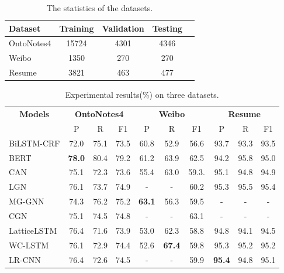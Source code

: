 \documentclass[conference]{IEEEtran}
\begin{document}
\begin{table}[h]
    \caption{The statistics of the datasets.}\label{datasets}
\centering
    \begin{tabular}{|l|c|c|c|c|}
    \hline
    \textbf{Dataset} & \textbf{Training} & \textbf{Validation} & \textbf{Testing}
         \\
    \hline
    OntoNotes4& 15724& 4301& 4346     \\
Weibo & 1350  & 270       & 270  \\
Resume   & 3821      &  463        &             477             \\
\hline
    \end{tabular}
\end{table}


    \begin{table*}[h]
        \caption{Experimental results(\%) on three datasets.
         }\label{result1}
\centering
\begin{tabular}{
|l|c|c|c|
            c|c|c|
            c|c|c|}
        \hline
\multicolumn{1}{|c|}{\multirow{2}{*}{\textbf{Models}}} 
        & \multicolumn{3}{c|}{\textbf{OntoNotes4}}  
        & \multicolumn{3}{c|}{\textbf{Weibo}}  
        & \multicolumn{3}{c|}{\textbf{Resume}}       
\\
        \cline{2-10}  

        & P & R & F1
        & P &R & F1
        & P & R & F1
\\
        \hline
BiLSTM-CRF\cite{huang2015bidirectional}  
            & 72.0	& 75.1	& 73.5
            & 60.8	& 52.9	& 56.6
            & 93.7	& 93.3	& 93.5
\\ 
        BERT\cite{devlin-etal-2019-bert}        
            &\textbf{78.0}	& 80.4	& 79.2     
            &61.2	            & 63.9	& 62.5 
            &94.2	            & 95.8	& 95.0
\\
        CAN\cite{zhu2019can}  
            &75.1   &72.3   &73.6
            &55.4   &63.0   &59.3.
            &95.1   &94.8   &94.9
            \\
        \hline
        LGN\cite{gui2019lexicon}                
            & 76.1	& 73.7	& 74.9
            & {-}	&{-} 	& 60.2
            & 95.3	& 95.5	& 95.4 
\\
        MG-GNN\cite{ding2019neural}   
            &  74.3	            & 76.2	& 75.2
            & \textbf{63.1}	& 56.3	& 59.5
            & {-}    &{-}    &  {-}   
\\
        CGN\cite{sui2019leverage}  
            &75.1 &74.5 &74.8
            &-   &  -   &63.1
            &{-}    &{-}    &  {-}  
            \\
        \hline
LatticeLSTM\cite{zhang2018chinese}
            &  76.4	& 71.6	& 73.9
            &  53.0	& 62.3	& 58.8
            &  94.8	& 94.1	& 94.5
\\
        WC-LSTM\cite{liu2019encoding}  
            & 76.1	& 72.9	& 74.4
            & 52.6	& \textbf{67.4}	& 59.8
            & 95.3	& 95.2	& 95.2
\\
        LR-CNN\cite{gui2019cnn}
            & 76.4	            & 72.6	& 74.5
            & -	                &-  	& 59.9  
            &\textbf{95.4}	&94.8	& 95.1
\\ 
         

\end{tabular}
\end{table*}
\end{document}
